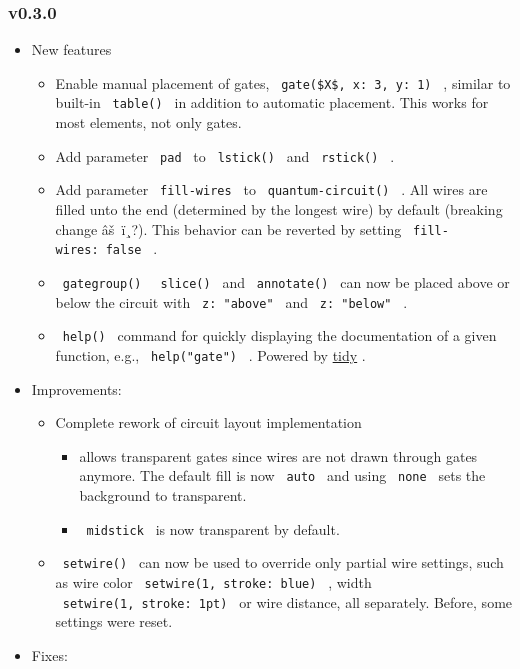 \subsubsection{v0.3.0}\label{v0.3.0}

\begin{itemize}
\tightlist
\item
  New features

  \begin{itemize}
  \tightlist
  \item
    Enable manual placement of gates,
    \texttt{\ gate(\$X\$,\ x:\ 3,\ y:\ 1)\ } , similar to built-in
    \texttt{\ table()\ } in addition to automatic placement. This works
    for most elements, not only gates.
  \item
    Add parameter \texttt{\ pad\ } to \texttt{\ lstick()\ } and
    \texttt{\ rstick()\ } .
  \item
    Add parameter \texttt{\ fill-wires\ } to
    \texttt{\ quantum-circuit()\ } . All wires are filled unto the end
    (determined by the longest wire) by default (breaking change
    âš~ï¸?). This behavior can be reverted by setting
    \texttt{\ fill-wires:\ false\ } .
  \item
    \texttt{\ gategroup()\ } \texttt{\ slice()\ } and
    \texttt{\ annotate()\ } can now be placed above or below the circuit
    with \texttt{\ z:\ "above"\ } and \texttt{\ z:\ "below"\ } .
  \item
    \texttt{\ help()\ } command for quickly displaying the documentation
    of a given function, e.g., \texttt{\ help("gate")\ } . Powered by
    \href{https://github.com/Mc-Zen/tidy}{tidy} .
  \end{itemize}
\item
  Improvements:

  \begin{itemize}
  \tightlist
  \item
    Complete rework of circuit layout implementation

    \begin{itemize}
    \tightlist
    \item
      allows transparent gates since wires are not drawn through gates
      anymore. The default fill is now \texttt{\ auto\ } and using
      \texttt{\ none\ } sets the background to transparent.
    \item
      \texttt{\ midstick\ } is now transparent by default.
    \end{itemize}
  \item
    \texttt{\ setwire()\ } can now be used to override only partial wire
    settings, such as wire color \texttt{\ setwire(1,\ stroke:\ blue)\ }
    , width \texttt{\ setwire(1,\ stroke:\ 1pt)\ } or wire distance, all
    separately. Before, some settings were reset.
  \end{itemize}
\item
  Fixes:


\end{itemize}
